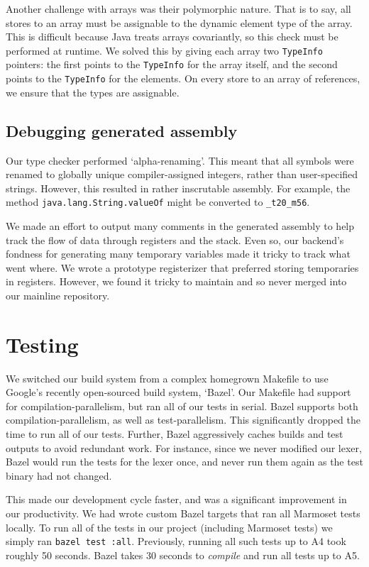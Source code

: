 \documentclass[12pt, titlepage]{article}
\newcommand{\z}[1]{\texttt{#1}}
\begin{document}
Another challenge with arrays was their polymorphic nature. That is to say, all
stores to an array must be assignable to the dynamic element type of the array.
This is difficult because Java treats arrays covariantly, so this check must be
performed at runtime. We solved this by giving each array two \z{TypeInfo}
pointers: the first points to the \z{TypeInfo} for the array itself, and the
second points to the \z{TypeInfo} for the elements. On every store to an array
of references, we ensure that the types are assignable.

\subsection{Debugging generated assembly}
Our type checker performed `alpha-renaming'. This meant that all symbols were
renamed to globally unique compiler-assigned integers, rather than
user-specified strings. However, this resulted in rather inscrutable assembly.
For example, the method \z{java.lang.String.valueOf} might be converted to
\z{\_t20\_m56}. %

We made an effort to output many comments in the generated assembly to help
track the flow of data through registers and the stack. Even so, our backend's
fondness for generating many temporary variables made it tricky to track what
went where. We wrote a prototype registerizer that preferred storing
temporaries in registers. However, we found it tricky to maintain and so never
merged into our mainline repository.

\section{Testing}

We switched our build system from a complex homegrown Makefile to use Google's
recently open-sourced build system, `Bazel'. Our Makefile had support for
compilation-parallelism, but ran all of our tests in serial. Bazel supports
both compilation-parallelism, as well as test-parallelism. This significantly
dropped the time to run all of our tests. Further, Bazel aggressively caches
builds and test outputs to avoid redundant work. For instance, since we never
modified our lexer, Bazel would run the tests for the lexer once, and never run
them again as the test binary had not changed.

This made our development cycle faster, and was a significant improvement in
our productivity. We had wrote custom Bazel targets that ran all Marmoset tests
locally. To run all of the tests in our project (including Marmoset tests) we
simply ran \z{bazel test :all}. Previously, running all such tests up to A4
took roughly 50 seconds. Bazel takes 30 seconds to \emph{compile} and run all
tests up to A5.
\end{document}
